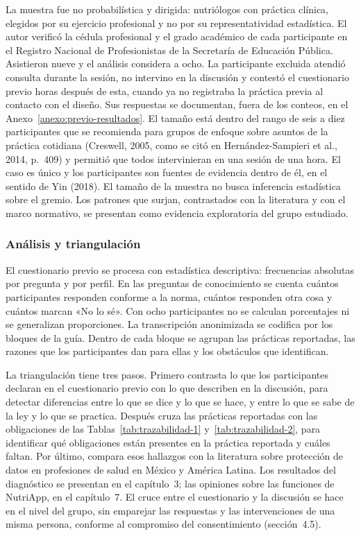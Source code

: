 \documentclass[12pt, a4paper]{article}
\begin{document}
La muestra fue no probabilística y dirigida: nutriólogos con práctica
clínica, elegidos por su ejercicio profesional y no por su
representatividad estadística. El autor verificó la cédula profesional y
el grado académico de cada participante en el Registro Nacional de
Profesionistas de la Secretaría de Educación Pública. Asistieron nueve y
el análisis considera a ocho. La participante excluida atendió consulta
durante la sesión, no intervino en la discusión y contestó el
cuestionario previo horas después de esta, cuando ya no registraba la
práctica previa al contacto con el diseño. Sus respuestas se documentan,
fuera de los conteos, en el Anexo~\ref{anexo:previo-resultados}. El
tamaño está dentro del rango de seis a diez participantes que se
recomienda para grupos de enfoque sobre asuntos de la práctica cotidiana
(Creswell, 2005, como se citó en Hernández-Sampieri et al., 2014,
p.~409) y permitió que todos intervinieran en una sesión de una hora. El
caso es único y los participantes son fuentes de evidencia dentro de él,
en el sentido de Yin (2018). El tamaño de la muestra no busca inferencia
estadística sobre el gremio. Los patrones que surjan, contrastados con
la literatura y con el marco normativo, se presentan como evidencia
exploratoria del grupo estudiado.
 
\subsubsection{Análisis y triangulación}
 
El cuestionario previo se procesa con estadística descriptiva:
frecuencias absolutas por pregunta y por perfil. En las preguntas de
conocimiento se cuenta cuántos participantes responden conforme a la
norma, cuántos responden otra cosa y cuántos marcan «No lo sé». Con ocho
participantes no se calculan porcentajes ni se generalizan proporciones.
La transcripción anonimizada se codifica por los bloques de la guía.
Dentro de cada bloque se agrupan las prácticas reportadas, las razones
que los participantes dan para ellas y los obstáculos que identifican.
 
La triangulación tiene tres pasos. Primero contrasta lo que los
participantes declaran en el cuestionario previo con lo que describen en
la discusión, para detectar diferencias entre lo que se dice y lo que se
hace, y entre lo que se sabe de la ley y lo que se practica. Después
cruza las prácticas reportadas con las obligaciones de las
Tablas~\ref{tab:trazabilidad-1} y~\ref{tab:trazabilidad-2}, para
identificar qué obligaciones están presentes en la práctica reportada y
cuáles faltan. Por último, compara esos hallazgos con la literatura
sobre protección de datos en profesiones de salud en México y América
Latina. Los resultados del diagnóstico se presentan en el capítulo~3;
las opiniones sobre las funciones de NutriApp, en el capítulo~7. El
cruce entre el cuestionario y la discusión se hace en el nivel del
grupo, sin emparejar las respuestas y las intervenciones de una misma
persona, conforme al compromiso del consentimiento (sección~4.5).
 
\end{document}
